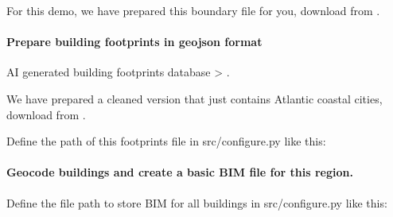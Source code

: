 \documentclass[letterpaper,10pt,english]{sphinxmanual}
\begin{document}
\begin{sphinxVerbatim}[commandchars=\\\{\}]
  
\end{sphinxVerbatim}

\sphinxAtStartPar
For this demo, we have prepared this boundary file for you, download from .


\paragraph{Prepare building footprints in geojson format}
\label{\detokenize{common/user_manual/preparedata:prepare-building-footprints-in-geojson-format}}
\sphinxAtStartPar
AI generated building footprints database \sphinxhyphen{}\textgreater{} .

\sphinxAtStartPar
We have prepared a cleaned version that just contains Atlantic coastal cities, download from .

\sphinxAtStartPar
Define the path of this footprints file in src/configure.py like this:

\begin{sphinxVerbatim}[commandchars=\\\{\}]
  
\end{sphinxVerbatim}


\paragraph{Geocode buildings and create a basic BIM file for this region.}
\label{\detokenize{common/user_manual/preparedata:geocode-buildings-and-create-a-basic-bim-file-for-this-region}}
\sphinxAtStartPar
Define the file path to store BIM for all buildings in src/configure.py like this:

\begin{sphinxVerbatim}[commandchars=\\\{\}]
  
\end{sphinxVerbatim}
\end{document}
